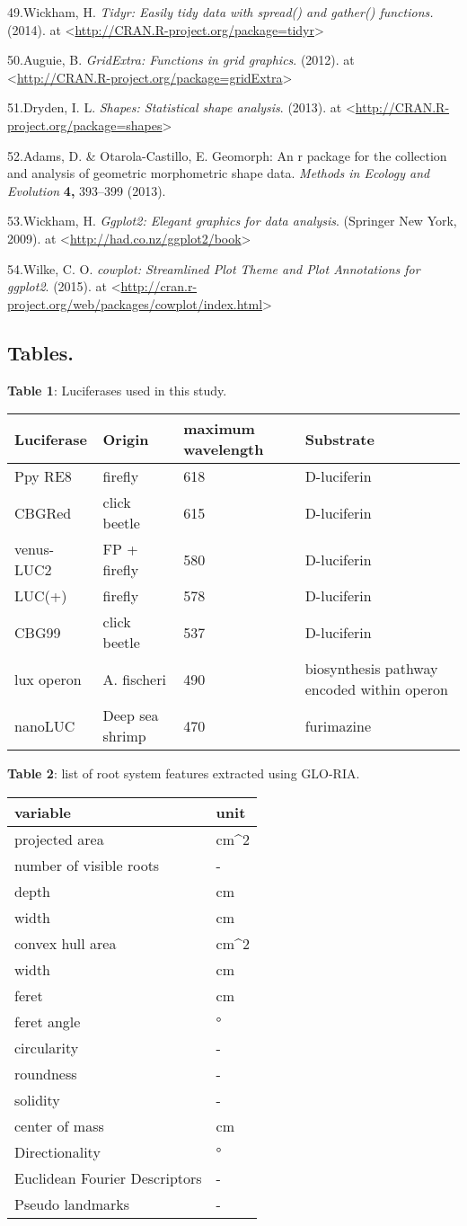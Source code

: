 \documentclass[]{article}
\begin{document}
49.Wickham, H. \emph{Tidyr: Easily tidy data with spread() and gather()
functions.} (2014). at
\textless{}\url{http://CRAN.R-project.org/package=tidyr}\textgreater{}

50.Auguie, B. \emph{GridExtra: Functions in grid graphics}. (2012). at
\textless{}\url{http://CRAN.R-project.org/package=gridExtra}\textgreater{}

51.Dryden, I. L. \emph{Shapes: Statistical shape analysis}. (2013). at
\textless{}\url{http://CRAN.R-project.org/package=shapes}\textgreater{}

52.Adams, D. \& Otarola-Castillo, E. Geomorph: An r package for the
collection and analysis of geometric morphometric shape data.
\emph{Methods in Ecology and Evolution} \textbf{4,} 393--399 (2013).

53.Wickham, H. \emph{Ggplot2: Elegant graphics for data analysis}.
(Springer New York, 2009). at
\textless{}\url{http://had.co.nz/ggplot2/book}\textgreater{}

54.Wilke, C. O. \emph{cowplot: Streamlined Plot Theme and Plot
Annotations for ggplot2}. (2015). at
\textless{}\url{http://cran.r-project.org/web/packages/cowplot/index.html}\textgreater{}

\subsection{Tables.}\label{tables.}

\textbf{Table 1}: Luciferases used in this study.

\begin{longtable}[c]{@{}llll@{}}
\toprule
Luciferase & Origin & maximum wavelength & Substrate\tabularnewline
\midrule
\endhead
Ppy RE8 & firefly & 618 & D-luciferin\tabularnewline
CBGRed & click beetle & 615 & D-luciferin\tabularnewline
venus-LUC2 & FP + firefly & 580 & D-luciferin\tabularnewline
LUC(+) & firefly & 578 & D-luciferin\tabularnewline
CBG99 & click beetle & 537 & D-luciferin\tabularnewline
lux operon & A. fischeri & 490 & biosynthesis pathway encoded within
operon\tabularnewline
nanoLUC & Deep sea shrimp & 470 & furimazine\tabularnewline
\bottomrule
\end{longtable}

\textbf{Table 2}: list of root system features extracted using GLO-RIA.

\begin{longtable}[c]{@{}ll@{}}
\toprule
variable & unit\tabularnewline
\midrule
\endhead
projected area & cm\^{}2\tabularnewline
number of visible roots & -\tabularnewline
depth & cm\tabularnewline
width & cm\tabularnewline
convex hull area & cm\^{}2\tabularnewline
width & cm\tabularnewline
feret & cm\tabularnewline
feret angle & °\tabularnewline
circularity & -\tabularnewline
roundness & -\tabularnewline
solidity & -\tabularnewline
center of mass & cm\tabularnewline
Directionality & °\tabularnewline
Euclidean Fourier Descriptors & -\tabularnewline
Pseudo landmarks & -\tabularnewline
\bottomrule
\end{longtable}
\end{document}
